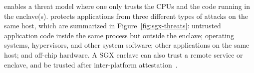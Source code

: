 \sgx{} enables a threat model where one only trusts the \intel{} CPUs and the 
code running in the enclave(s).
\sgx{} protects applications from three different types of attacks on the same host, which are summarized in Figure~\ref{fig:sgx-threats}: untrusted application code inside the same process but outside the enclave; operating systems, hypervisors, and other system software;
other applications on the same host; and off-chip hardware.
A SGX enclave can also trust a remote service or enclave, and be trusted after inter-platform attestation~\cite{sgx-attestation}.










